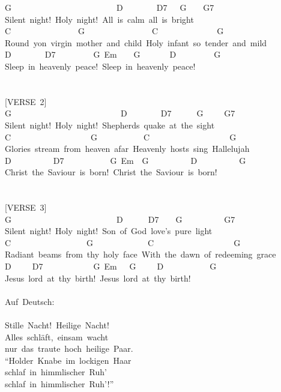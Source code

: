 \documentclass[]{book}
\begin{document}
G~~~~~~~~~~~~~~~~~~~~~~~~~D~~~~~~~~D7~~~G~~~~G7~~~~~~\\
Silent~night!~Holy~night!~All~is~calm~all~is~bright~\\
C~~~~~~~~~~~~~~~~G~~~~~~~~~~~~~~~~C~~~~~~~~~~~~~~G\\
Round~yon~virgin~mother~and~child~Holy~infant~so~tender~and~mild~\\
D~~~~~~~~D7~~~~~~~~~G~Em~~~~G~~~~~~~D~~~~~~~~~G\\
Sleep~in~heavenly~peace!~Sleep~in~heavenly~peace!\\
~\\
~\\
{[}VERSE~2{]}\\
G~~~~~~~~~~~~~~~~~~~~~~~~~~D~~~~~~~~D7~~~~~~G~~~~~G7~~~~~\\
Silent~night!~Holy~night!~Shepherds~quake~at~the~sight\\
C~~~~~~~~~~~~~~~~~~~G~~~~~~~~~~~C~~~~~~~~~~~~~~~~~~~G\\
Glories~stream~from~heaven~afar~Heavenly~hosts~sing~Hallelujah\\
D~~~~~~~~~~D7~~~~~~~~~~~G~Em~~G~~~~~~~~~~D~~~~~~~~~~G\\
Christ~the~Saviour~is~born!~Christ~the~Saviour~is~born!\\
~\\
~\\
{[}VERSE~3{]}\\
G~~~~~~~~~~~~~~~~~~~~~~~~~D~~~~~~D7~~~~G~~~~~~~~~~G7\\
Silent~night!~Holy~night!~Son~of~God~love's~pure~light~\\
C~~~~~~~~~~~~~~~~~~G~~~~~~~~~~~~~C~~~~~~~~~~~~~~~~~~~G\\
Radiant~beams~from~thy~holy~face~With~the~dawn~of~redeeming~grace\\
D~~~~~D7~~~~~~~~~~~~G~Em~~~G~~~~~D~~~~~~~~~~~G\\
Jesus~lord~at~thy~birth!~Jesus~lord~at~thy~birth!~\\
~\\
Auf~Deutsch:\\
~\\
Stille~Nacht!~Heilige~Nacht!\\
Alles~schläft,~einsam~wacht\\
nur~das~traute~hoch~heilige~Paar.\\
``Holder~Knabe~im~lockigen~Haar\\
schlaf~in~himmlischer~Ruh'\\
schlaf~in~himmlischer~Ruh'!''\\
\end{document}
